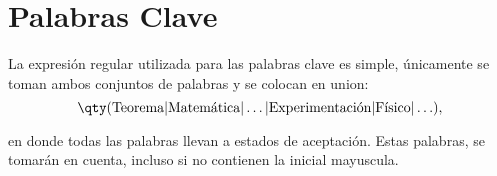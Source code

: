 \section{Palabras Clave}
La expresión regular utilizada para las palabras clave es simple, únicamente se toman ambos conjuntos de palabras y se colocan en union:
	$$\qty(\text{Teorema}|\text{Matemática}|\ldots |\text{Experimentación}| \text{Físico}|\ldots),$$

en donde todas las palabras llevan a estados de aceptación. Estas palabras, se tomarán en cuenta, incluso si no contienen la inicial mayuscula.























